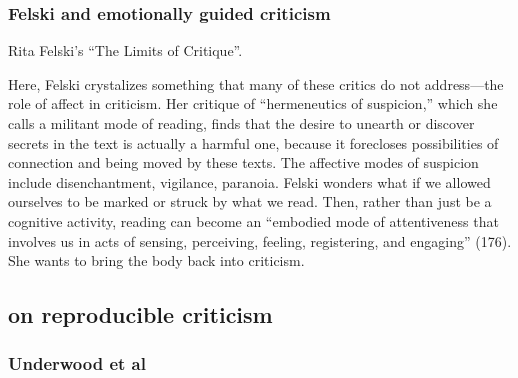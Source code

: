 \documentclass[11pt]{article}
\begin{document}
\subsubsection{Felski and emotionally guided criticism}
\label{sec:orgf896df8}

Rita Felski’s “The Limits of Critique”.  

Here, Felski crystalizes something that many of these critics do not
address---the role of affect in criticism. Her critique of
“hermeneutics of suspicion,” which she calls a militant mode of
reading, finds that the desire to unearth or discover secrets in the
text is actually a harmful one, because it forecloses possibilities of
connection and being moved by these texts. The affective modes of
suspicion include disenchantment, vigilance, paranoia. Felski wonders
what if we allowed ourselves to be marked or struck by what we
read. Then, rather than just be a cognitive activity, reading can
become an “embodied mode of attentiveness that involves us in acts of
sensing, perceiving, feeling, registering, and engaging” (176). She
wants to bring the body back into criticism.


\subsection{on reproducible criticism}
\label{sec:org1789c85}
\subsubsection{Underwood et al}
\label{sec:org911fe3c}
\end{document}
